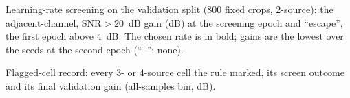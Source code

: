 \documentclass[journal]{IEEEtran}
\begin{document}
\begin{table}[t]
\centering
\caption{Learning-rate screening on the validation split (800 fixed crops,
2-source): the adjacent-channel, SNR${>}20$~dB gain (dB) at the screening epoch
and ``escape'', the first epoch above 4~dB. The chosen rate is in bold; gains are
the lowest over the seeds at the second epoch (``--'': none).}
\label{tab:lr}
\resizebox{\columnwidth}{!}{%
}
\end{table}

\begin{table}[t]
\centering
\caption{Flagged-cell record: every 3- or 4-source cell the rule marked, its screen
outcome and its final validation gain (all-samples bin, dB).}
\label{tab:flagged}
\resizebox{\columnwidth}{!}{%
}
\end{table}



\end{document}
